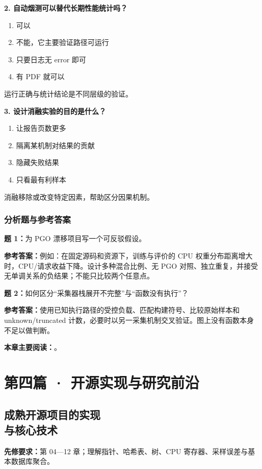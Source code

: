 \documentclass[UTF8,fontset=fandol,openany,11pt]{ctexbook}
\begin{document}
\noindent\textbf{2. 自动烟测可以替代长期性能统计吗？}
\begin{enumerate}[label=\Alph*.]
\item 可以
\item 不能，它主要验证路径可运行
\item 只要日志无 error 即可
\item 有 PDF 就可以
\end{enumerate}
运行正确与统计结论是不同层级的验证。

\noindent\textbf{3. 设计消融实验的目的是什么？}
\begin{enumerate}[label=\Alph*.]
\item 让报告页数更多
\item 隔离某机制对结果的贡献
\item 隐藏失败结果
\item 只看最有利样本
\end{enumerate}
消融移除或改变特定因素，帮助区分因果机制。

\section{分析题与参考答案}
\noindent\textbf{题 1：}为 PGO 漂移项目写一个可反驳假设。

\noindent\textbf{参考答案：}例如：在固定源码和资源下，训练与评价的 CPU 权重分布距离增大时，CPU/请求收益下降。设计多种混合比例、无 PGO 对照、独立重复，并接受无单调关系的负结果；不能只比较两个任意点。

\noindent\textbf{题 2：}如何区分“采集器栈展开不完整”与“函数没有执行”？

\noindent\textbf{参考答案：}使用已知执行路径的受控负载、匹配构建符号、比较原始样本和 unknown/truncated 计数，必要时以另一采集机制交叉验证。图上没有函数本身不足以做判断。

\medskip\noindent\textbf{本章主要阅读：}\cite{go-diagnostics}\cite{go-pgo}\cite{go-pprof}。
\part*{第四篇 · 开源实现与研究前沿}
\chapter[成熟开源项目的实现与核心技术]{成熟开源项目的实现\\与核心技术}
\label{ch:15}
\par\medskip
\noindent\textbf{先修要求：}第 04—12 章；理解指针、哈希表、树、CPU 寄存器、采样误差与基本数据库聚合。
\end{document}
